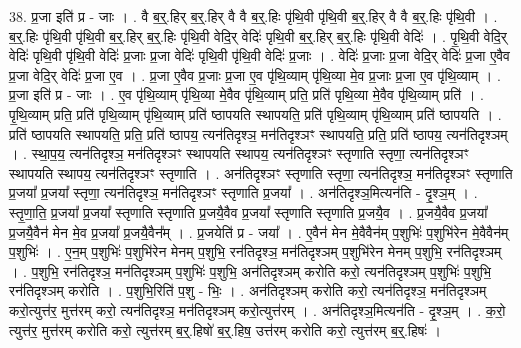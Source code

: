 \documentclass[17pt]{extarticle}
\begin{document}
38. प्र॒जा इति॑ प्र - जाः । . वै ब॒र्॒.हिर् ब॒र्॒.हिर् वै वै ब॒र्॒.हिः पृ॑थि॒वी पृ॑थि॒वी ब॒र्॒.हिर् वै वै ब॒र्॒.हिः पृ॑थि॒वी । . ब॒र्॒.हिः पृ॑थि॒वी पृ॑थि॒वी ब॒र्॒.हिर् ब॒र्॒.हिः पृ॑थि॒वी वेदि॒र् वेदिः॑ पृथि॒वी ब॒र्॒.हिर् ब॒र्॒.हिः पृ॑थि॒वी वेदिः॑ । . पृ॒थि॒वी वेदि॒र् वेदिः॑ पृथि॒वी पृ॑थि॒वी वेदिः॑ प्र॒जाः प्र॒जा वेदिः॑ पृथि॒वी पृ॑थि॒वी वेदिः॑ प्र॒जाः । . वेदिः॑ प्र॒जाः प्र॒जा वेदि॒र् वेदिः॑ प्र॒जा ए॒वैव प्र॒जा वेदि॒र् वेदिः॑ प्र॒जा ए॒व । . प्र॒जा ए॒वैव प्र॒जाः प्र॒जा ए॒व पृ॑थि॒व्याम् पृ॑थि॒व्या मे॒व प्र॒जाः प्र॒जा ए॒व पृ॑थि॒व्याम् । . प्र॒जा इति॑ प्र - जाः । . ए॒व पृ॑थि॒व्याम् पृ॑थि॒व्या मे॒वैव पृ॑थि॒व्याम् प्रति॒ प्रति॑ पृथि॒व्या मे॒वैव पृ॑थि॒व्याम् प्रति॑ । . पृ॒थि॒व्याम् प्रति॒ प्रति॑ पृथि॒व्याम् पृ॑थि॒व्याम् प्रति॑ ष्ठापयति स्थापयति॒ प्रति॑ पृथि॒व्याम् पृ॑थि॒व्याम् प्रति॑ ष्ठापयति । . प्रति॑ ष्ठापयति स्थापयति॒ प्रति॒ प्रति॑ ष्ठापय॒ त्यन॑तिदृश्ञ॒ मन॑तिदृश्ञꣳ स्थापयति॒ प्रति॒ प्रति॑ ष्ठापय॒ त्यन॑तिदृश्ञम् । . स्था॒प॒य॒ त्यन॑तिदृश्ञ॒ मन॑तिदृश्ञꣳ स्थापयति स्थापय॒ त्यन॑तिदृश्ञꣳ स्तृणाति स्तृणा॒ त्यन॑तिदृश्ञꣳ स्थापयति स्थापय॒ त्यन॑तिदृश्ञꣳ स्तृणाति । . अन॑तिदृश्ञꣳ स्तृणाति स्तृणा॒ त्यन॑तिदृश्ञ॒ मन॑तिदृश्ञꣳ स्तृणाति प्र॒जया᳚ प्र॒जया᳚ स्तृणा॒ त्यन॑तिदृश्ञ॒ मन॑तिदृश्ञꣳ स्तृणाति प्र॒जया᳚ । . अन॑तिदृश्ञ॒मित्यन॑ति - दृ॒श्ञ॒म् । . स्तृ॒णा॒ति॒ प्र॒जया᳚ प्र॒जया᳚ स्तृणाति स्तृणाति प्र॒जयै॒वैव प्र॒जया᳚ स्तृणाति स्तृणाति प्र॒जयै॒व । . प्र॒जयै॒वैव प्र॒जया᳚ प्र॒जयै॒वैन॑ मेन मे॒व प्र॒जया᳚ प्र॒जयै॒वैन᳚म् । . प्र॒जयेति॑ प्र - जया᳚ । . ए॒वैन॑ मेन मे॒वैवैन॑म् प॒शुभिः॑ प॒शुभि॑रेन मे॒वैवैन॑म् प॒शुभिः॑ । . ए॒न॒म् प॒शुभिः॑ प॒शुभि॑रेन मेनम् प॒शुभि॒ रन॑तिदृश्ञ॒ मन॑तिदृश्ञम् प॒शुभि॑रेन मेनम् प॒शुभि॒ रन॑तिदृश्ञम् । . प॒शुभि॒ रन॑तिदृश्ञ॒ मन॑तिदृश्ञम् प॒शुभिः॑ प॒शुभि॒ अन॑तिदृश्ञम् करोति करो॒ त्यन॑तिदृश्ञम् प॒शुभिः॑ प॒शुभि॒ रन॑तिदृश्ञम् करोति । . प॒शुभि॒रिति॑ प॒शु - भिः॒ । . अन॑तिदृश्ञम् करोति करो॒ त्यन॑तिदृश्ञ॒ मन॑तिदृश्ञम् करो॒त्युत्त॑र॒ मुत्त॑रम् करो॒ त्यन॑तिदृश्ञ॒ मन॑तिदृश्ञम् करो॒त्युत्त॑रम् । . अन॑तिदृश्ञ॒मित्यन॑ति - दृ॒श्ञ॒म् । . क॒रो॒ त्युत्त॑र॒ मुत्त॑रम् करोति करो॒ त्युत्त॑रम् ब॒र्॒.हिषो॑ ब॒र्॒.हिष॒ उत्त॑रम् करोति करो॒ त्युत्त॑रम् ब॒र्॒.हिषः॑ । \newline
\pagebreak
{}
\end{document}
